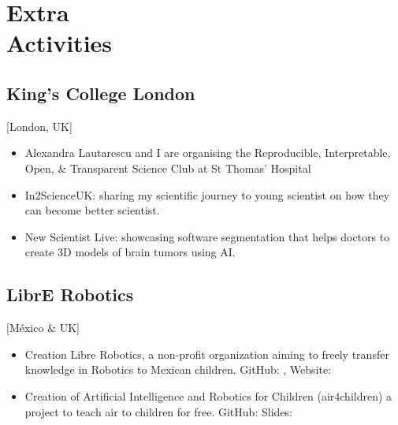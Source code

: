 \documentclass{mycv}
\begin{document}
\section{Extra \\ Activities}
\subsection{King's College London}[London, UK]
\begin{positions}
\end{positions}
\begin{itemize}
\item Alexandra Lautarescu and I are organising 
the Reproducible, Interpretable, Open, \& Transparent Science Club
at St Thomas' Hospital 
\item In2ScienceUK: sharing my scientific journey to young
scientist on how they can become better scientist.  
\item New Scientist Live: showcasing software segmentation
that helps doctors to create 3D models of brain tumors using AI.  
\end{itemize}



\subsection{LibrE Robotics}[M\'exico \& UK]
\begin{itemize}

\item Creation Libre Robotics, a non-profit organization aiming to freely transfer knowledge in Robotics to Mexican children. GitHub: \href{https://github.com/librerobotics}{\faGithubAlt}, Website: \href{https://sites.google.com/site/LibreRobotics/}{\faExternalLink}  

\item Creation of Artificial Intelligence and Robotics for Children (air4children) a project to teach
air to children for free. GitHub: \href{https://github.com/librerobotics/air4children}{\faGithubAlt} Slides: \href{https://github.com/librerobotics/air4children/blob/master/docs/slides/presentation.air4children.pdf}{\faFilePdfO}  
\end{itemize}
\end{document}

